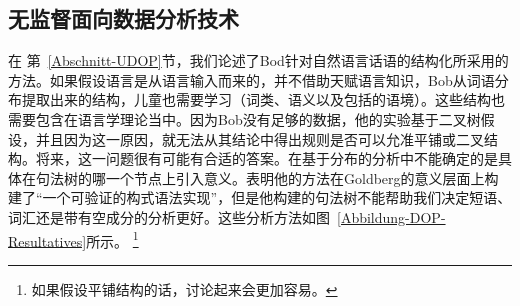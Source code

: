 \begin{exe}
\begin{xlist}[iv.]
\begin{exe}
\begin{xlist}[iv.]
\subsection{无监督面向数据分析技术}
\label{Abschnitt-U-Dop-phrasal}

在 第~\ref{Abschnitt-UDOP}节，我们论述了Bod针对自然语言话语的结构化所采用的方法\citeyearpar{Bod2009a}。如果假设语言是从语言输入而来的，并不借助天赋语言知识，Bob从词语分布提取出来的结构，儿童也需要学习（词类、语义以及包括的语境）。这些结构也需要包含在语言学理论当中。因为Bob没有足够的数据，他的实验基于二叉树假设，并且因为这一原因，就无法从其结论中得出规则是否可以允准平铺或二叉结构。将来，这一问题很有可能有合适的答案。在基于分布的分析中不能确定的是具体在句法树的哪一个节点上引入意义。\citet[]{Bod2009b}表明他的方法在Goldberg的意义层面上构建了“一个可验证的构式语法实现”，但是他构建的句法树不能帮助我们决定短语、词汇还是带有空成分的分析更好。这些分析方法如图~\vref{Abbildung-DOP-Resultatives}所示。
\footnote{ 
如果假设平铺结构的话，讨论起来会更加容易。

}
\end{xlist}
\end{exe}
\end{xlist}
\end{exe}
